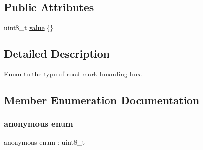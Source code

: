 \subsection*{Public Attributes}
\begin{DoxyCompactItemize}
\item 
uint8\+\_\+t \hyperlink{structmaf__perception__interface_1_1RoadMarkTypeEnum_a3b9dfcb22a017f2eaf7fd65fcc9af29a}{value} \{\}
\end{DoxyCompactItemize}


\subsection{Detailed Description}
Enum to the type of road mark bounding box. 

\subsection{Member Enumeration Documentation}
\mbox{\label{structmaf__perception__interface_1_1RoadMarkTypeEnum_aac250cb551a02b2b77082ceab5bc4951}} 
\subsubsection{\texorpdfstring{anonymous enum}{anonymous enum}}
{\footnotesize\ttfamily anonymous enum \+: uint8\+\_\+t}

